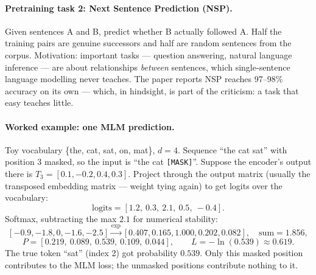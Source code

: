 \documentclass[11pt,a4paper]{article}
\begin{document}
\paragraph{Pretraining task 2: Next Sentence Prediction (NSP).} Given sentences A and B,
predict whether B actually followed A. Half the training pairs are genuine successors and
half are random sentences from the corpus. Motivation: important tasks --- question
answering, natural language inference --- are about relationships \emph{between} sentences,
which single-sentence language modelling never teaches. The paper reports NSP reaches
97--98\% accuracy on its own --- which, in hindsight, is part of the criticism: a task that
easy teaches little.

\paragraph{Worked example: one MLM prediction.} Toy vocabulary \{the, cat, sat, on, mat\},
$d = 4$. Sequence ``the cat sat'' with position 3 masked, so the input is
``the cat \texttt{[MASK]}''. Suppose the encoder's output there is
$T_3 = [0.1, -0.2, 0.4, 0.3]$. Project through the output matrix (usually the transposed
embedding matrix --- weight tying again) to get logits over the vocabulary:
\[
\text{logits} = [1.2,\ 0.3,\ 2.1,\ 0.5,\ -0.4].
\]
Softmax, subtracting the max $2.1$ for numerical stability:
\[
[-0.9, -1.8, 0, -1.6, -2.5] \xrightarrow{\exp} [0.407, 0.165, 1.000, 0.202, 0.082],
\quad \text{sum} = 1.856,
\]
\[
P = [0.219,\ 0.089,\ \mathbf{0.539},\ 0.109,\ 0.044], \qquad
L = -\ln(0.539) \approx 0.619 .
\]
The true token ``sat'' (index 2) got probability $0.539$. Only this masked position
contributes to the MLM loss; the unmasked positions contribute nothing to it.
\end{document}
